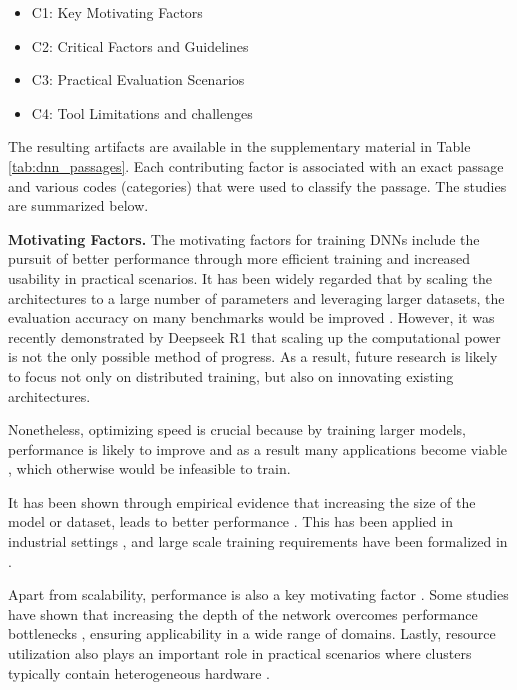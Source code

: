 \begin{itemize}
	\item C1: Key Motivating Factors
	\item C2: Critical Factors and Guidelines
	\item C3: Practical Evaluation Scenarios
	\item C4: Tool Limitations and challenges
\end{itemize}

The resulting artifacts are available in the supplementary material in Table
\ref{tab:dnn_passages}. Each contributing factor is associated with an exact passage and various
codes (categories) that were used to classify the passage. The studies are summarized below.

\textbf{Motivating Factors.}
The motivating factors for training DNNs include the pursuit of better performance through more
efficient training and increased usability in practical scenarios. It has been widely regarded that
by scaling the architectures to a large number of parameters and leveraging larger datasets, the
evaluation accuracy on many benchmarks would be improved \cite{hestness_deep_2017}. However, it was
recently demonstrated by Deepseek R1
\cite{deepseekai2025deepseekr1incentivizingreasoningcapability} that scaling up the computational
power is not the only possible method of progress. As a result, future research is likely to focus
not only on distributed training, but also on innovating existing architectures.

Nonetheless, optimizing speed is crucial because by training larger models, performance is likely
to improve  and as a result many applications become viable , which
otherwise would be infeasible to train.

It has been shown through empirical evidence that increasing the size of the model or dataset,
leads to better performance . This has been applied in industrial settings
, and large scale training requirements have been formalized in
.

Apart from scalability, performance is also a key motivating factor . Some
studies have shown that increasing the depth of the network overcomes performance bottlenecks
, ensuring applicability in a wide range of domains. Lastly, resource utilization
also plays an important role in practical scenarios where clusters typically contain heterogeneous
hardware .


